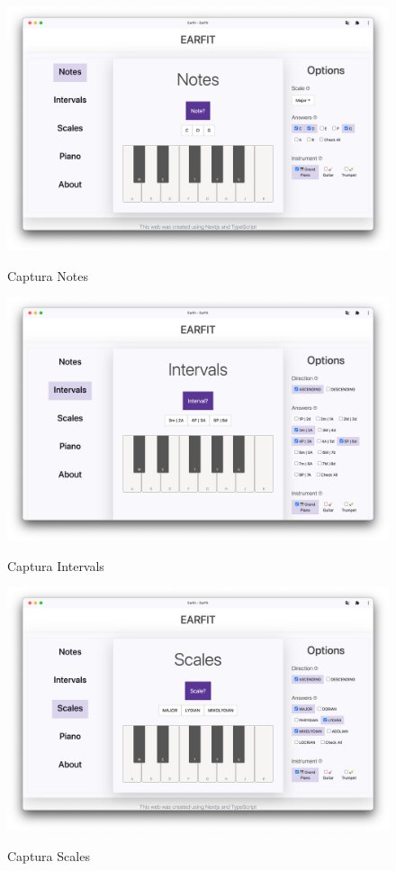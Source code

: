 \documentclass[12pt,twoside,titlepage]{report}
\begin{document}
{\begin{figure}[H]
    \centering
    \includegraphics[scale=0.28]{Capturas Earfit/PC/Notes}
    \label{fig:PCNotes}
    \caption{Captura Notes}
\end{figure}

\begin{figure}[H]
    \centering
    \includegraphics[scale=0.28]{Capturas Earfit/PC/Intervals}
    \label{fig:PCIntervals}
    \caption{Captura Intervals}
\end{figure}

\begin{figure}[H]
    \centering
    \includegraphics[scale=0.28]{Capturas Earfit/PC/Scales}
    \label{fig:PCScales}
    \caption{Captura Scales}
\end{figure}

}
\end{document}
